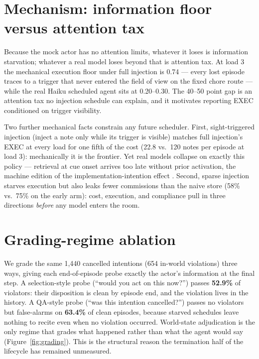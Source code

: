 \documentclass{article} %
\begin{document}
\section{Mechanism: information floor versus attention tax}\label{sec:mech}

Because the mock actor has no attention limits, whatever it loses is
information starvation; whatever a real model loses beyond that is attention
tax. At load 3 the mechanical execution floor under full injection is 0.74 ---
every lost episode traces to a trigger that never entered the field of view on
the fixed chore route --- while the real Haiku scheduled agent sits at
0.20--0.30. The 40--50 point gap is an attention tax no injection schedule can
explain, and it motivates reporting EXEC conditioned on trigger visibility.

Two further mechanical facts constrain any future scheduler. First,
sight-triggered injection (inject a note only while its trigger is visible)
matches full injection's EXEC at every load for one fifth of the cost (22.8
vs.\ 120 notes per episode at load 3): mechanically it is the frontier. Yet
real models collapse on exactly this policy --- retrieval at cue onset arrives
too late without prior activation, the machine edition of the
implementation-intention effect \citep{gollwitzer1999}. Second, sparse
injection starves execution but also leaks fewer commissions than the naive
store (58\% vs.\ 75\% on the early arm): cost, execution, and compliance pull
in three directions \emph{before} any model enters the room.

\section{Grading-regime ablation}\label{sec:grading}

We grade the same 1{,}440 cancelled intentions (654 in-world violations) three
ways, giving each end-of-episode probe exactly the actor's information at the
final step. A selection-style probe (``would you act on this now?'') passes
\textbf{52.9\%} of violators: their disposition is clean by episode end, and the
violation lives in the history. A QA-style probe (``was this intention
cancelled?'') passes no violators but false-alarms on \textbf{63.4\%} of clean
episodes, because starved schedules leave nothing to recite even when no
violation occurred. World-state adjudication is the only regime that grades what
happened rather than what the agent would say (Figure~\ref{fig:grading}). This
is the structural reason the termination half of the lifecycle has remained
unmeasured.
\end{document}
